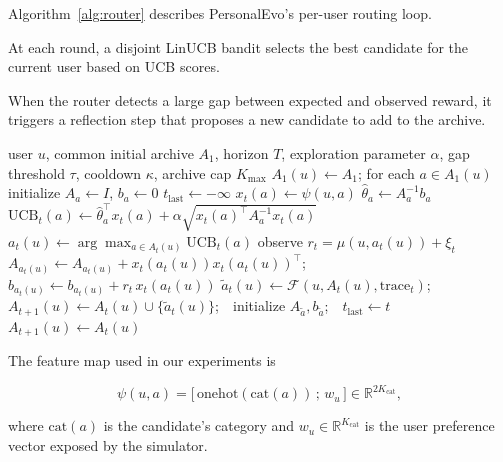 \documentclass{article} %
\begin{document}
Algorithm~\ref{alg:router} describes PersonalEvo's per-user routing loop.

At each round, a disjoint LinUCB bandit selects the best candidate for the current user based on UCB scores.

When the router detects a large gap between expected and observed reward, it triggers a reflection step that proposes a new candidate to add to the archive.

\begin{algorithm}[t]
\caption{Per-user personalized routing over a growing archive.}
\label{alg:router}
\begin{algorithmic}[1]
\Require user $u$, common initial archive $A_1$, horizon $T$, exploration parameter $\alpha$, gap threshold $\tau$, cooldown $\kappa$, archive cap $K_{\max}$
\State $A_1(u) \gets A_1$; for each $a \in A_1(u)$ initialize $A_a \gets I$, $b_a \gets 0$
\State $t_{\mathrm{last}} \gets -\infty$
        \State $x_t(a) \gets \psi(u,a)$ 
        \State $\hat\theta_a \gets A_a^{-1} b_a$
        \State $\mathrm{UCB}_t(a) \gets \hat\theta_a^\top x_t(a) + \alpha \sqrt{x_t(a)^\top A_a^{-1} x_t(a)}$
    \EndFor
    \State $a_t(u) \gets \arg\max_{a \in A_t(u)} \mathrm{UCB}_t(a)$
    \State observe $r_t = \mu(u, a_t(u)) + \xi_t$
    \State $A_{a_t(u)} \gets A_{a_t(u)} + x_t(a_t(u)) x_t(a_t(u))^\top$;\quad $b_{a_t(u)} \gets b_{a_t(u)} + r_t \, x_t(a_t(u))$
        \State $\tilde a_t(u) \gets \mathcal{F}(u, A_t(u), \mathrm{trace}_t)$;\ \ $A_{t+1}(u) \gets A_t(u) \cup \{\tilde a_t(u)\}$;\ \ initialize $A_{\tilde a}, b_{\tilde a}$;\ \ $t_{\mathrm{last}} \gets t$
    \Else
        \State $A_{t+1}(u) \gets A_t(u)$
    \EndIf
\EndFor
\end{algorithmic}
\end{algorithm}

The feature map used in our experiments is

\begin{equation}
\label{eq:method-feat}
\psi(u,a) = \big[\,\mathrm{onehot}(\mathrm{cat}(a))\,;\, w_u\,\big] \in \mathbb{R}^{2K_{\mathrm{cat}}},
\end{equation}

where $\mathrm{cat}(a)$ is the candidate's category and $w_u \in \mathbb{R}^{K_{\mathrm{cat}}}$ is the user preference vector exposed by the simulator.
\end{document}
